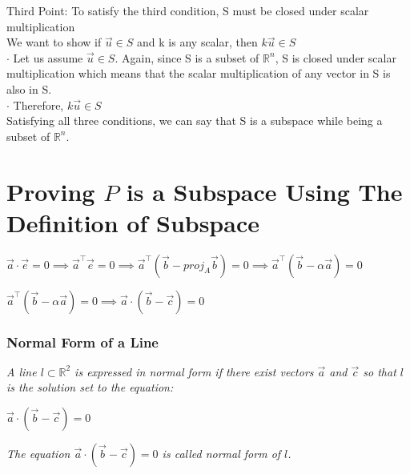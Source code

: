 \documentclass{article}
\newcommand{\vectorproj}[2][]{\textit{proj}_{{#1}}{#2}}
\begin{document}
{{Third Point:
To satisfy the third condition, S must be closed under scalar multiplication \\
We want to show if $\vec{u} \in S$ and k is any scalar, then $k\vec{u} \in S$ \\
$\cdot$ Let us assume $\vec{u} \in S$. Again, since S is a subset of $\mathbb{R}^n$, S is closed under scalar multiplication which means that the scalar multiplication of any vector in S is also in S. \\
$\cdot$ Therefore, $k\vec{u} \in S$ \\

Satisfying all three conditions, we can say that S is a subspace while being a subset of $\mathbb{R}^n$.
}


\section{Proving $P$ is a Subspace Using The Definition of Subspace}

\begin{center}
	$\vec{a} \cdot \vec{e} = 0 \implies \vec{a}^\intercal\vec{e} = 0 \implies \vec{a}^\intercal(\vec{b} - \vectorproj[A]{\vec{b}}) = 0 \implies  \vec{a}^\intercal(\vec{b} - \alpha\vec{a}) = 0
	$ 
	
	
	$\vec{a}^\intercal(\vec{b} - \alpha\vec{a}) = 0 \implies \vec{a} \cdot{(\vec{b} - \vec{c})} = 0
	$
 \subsubsection{Normal Form of a Line}	
 
\textit{A line $l \subset \mathbb{R}^2$ is expressed in normal form if there exist vectors $\vec{a}$ and $\vec{c}$ so that $l$ is the solution set to the equation:}

	$\vec{a} \cdot{(\vec{b} - \vec{c})} = 0
	$
	
\textit{The equation $\vec{a} \cdot{(\vec{b} - \vec{c})} = 0$ is called normal form of $l$.} 
	
\end{center}

}
\end{document}
